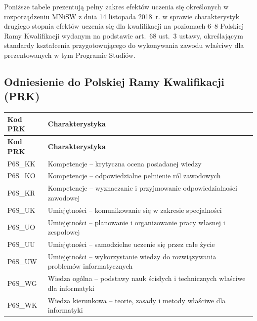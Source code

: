 \documentclass[12pt,a4paper]{article}
\newcommand{\thdrule}{\noalign{\global\setlength{\extrarowheight}{0pt}}}
\newcommand{\thdend}{\noalign{\global\setlength{\extrarowheight}{4pt}}}
\begin{document}
Poniższe tabele prezentują pełny zakres efektów uczenia się określonych w rozporządzeniu MNiSW z dnia 14 listopada 2018~r. w sprawie charakterystyk drugiego stopnia efektów uczenia się dla kwalifikacji na poziomach 6--8 Polskiej Ramy Kwalifikacji wydanym na podstawie art.~68 ust.~3 ustawy, określającym standardy kształcenia przygotowującego do wykonywania zawodu właściwy dla prezentowanych w tym Programie Studiów.

\subsection*{Odniesienie do Polskiej Ramy Kwalifikacji (PRK)}

{\scriptsize
\begin{longtable}{m{2.8cm}m{12cm}}
\thdrule\toprule
\rowcolor{pjatkRed} {\color{white}\footnotesize\textbf{\vphantom{Ag}Kod PRK}} & {\color{white}\footnotesize\textbf{\vphantom{Ag}Charakterystyka}} \\
\midrule\thdend
\endfirsthead
\thdrule\toprule
\rowcolor{pjatkRed} {\color{white}\footnotesize\textbf{\vphantom{Ag}Kod PRK}} & {\color{white}\footnotesize\textbf{\vphantom{Ag}Charakterystyka}} \\
\midrule\thdend
\endhead
\rowcolor{tableRowLight} P6S\_KK & Kompetencje -- krytyczna ocena posiadanej wiedzy \\
\rowcolor{tableRowAlt} P6S\_KO & Kompetencje -- odpowiedzialne pełnienie ról zawodowych \\
\rowcolor{tableRowLight} P6S\_KR & Kompetencje -- wyznaczanie i przyjmowanie odpowiedzialności zawodowej \\
\rowcolor{tableRowAlt} P6S\_UK & Umiejętności -- komunikowanie się w zakresie specjalności \\
\rowcolor{tableRowLight} P6S\_UO & Umiejętności -- planowanie i organizowanie pracy własnej i zespołowej \\
\rowcolor{tableRowAlt} P6S\_UU & Umiejętności -- samodzielne uczenie się przez całe życie \\
\rowcolor{tableRowLight} P6S\_UW & Umiejętności -- wykorzystanie wiedzy do rozwiązywania problemów informatycznych \\
\rowcolor{tableRowAlt} P6S\_WG & Wiedza ogólna -- podstawy nauk ścisłych i technicznych właściwe dla informatyki \\
\rowcolor{tableRowLight} P6S\_WK & Wiedza kierunkowa -- teorie, zasady i metody właściwe dla informatyki \\
\bottomrule
\end{longtable}}
\end{document}
